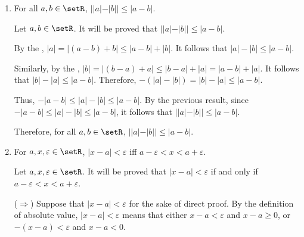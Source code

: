 \begin{enumerate}
\begin{enumerate}
\begin{subprove}
      (\(\Leftarrow\)) Suppose that \(-a \le b \le a\) for the sake of direct proof.
      Since \(-a \le b \le a\), it follows that \(a \ge -a\), which implies \(a \ge 0\).
      By the definition of absolute value, two cases are considered.
      
      \textbf{Case 1:} Suppose \(b \ge 0\).
      Then, by the definition of absolute value, \(|b| = b\).
      Since \(b \le a\), it follows that \(|b| = b \le a\).
      
      \textbf{Case 2:} Suppose \(b < 0\).
      Then, by the definition of absolute value, \(|b| = -b\).
      Since \(-a \le b\), it follows that \(-b \le a\).
      Therefore, \(|b| = -b \le a\).
      
      Therefore, if \(-a \le b \le a\), then \(|b| \le a\).
      
      Therefore, \(|b| \le a\) if and only if \(-a \le b \le a\).
    \end{subprove}
    \item For all \(a,b\in\setR\), \(||a|-|b||\le|a-b|\).
    \begin{subprove}
      Let \(a, b \in \setR\).
      It will be proved that \(||a| - |b|| \le |a - b|\).
      
      By the , \(|a| = |(a - b) + b| \le |a - b| + |b|\).
      It follows that \(|a| - |b| \le |a - b|\).
      
      Similarly, by the , \(|b| = |(b - a) + a| \le |b - a| + |a| = |a - b| + |a|\).
      It follows that \(|b| - |a| \le |a - b|\).
      Therefore, \(-(|a| - |b|) = |b| - |a| \le |a - b|\).
      
      Thus, \(-|a - b| \le |a| - |b| \le |a - b|\).
      By the previous result, since \(-|a - b| \le |a| - |b| \le |a - b|\), 
      it follows that \(||a| - |b|| \le |a - b|\).
      
      Therefore, for all \(a, b \in \setR\), \(||a| - |b|| \le |a - b|\).
    \end{subprove}
    \item For \(a,x,\varepsilon\in\setR\), \(|x-a|<\varepsilon\) iff \(a-\varepsilon<x<a+\varepsilon\).
    \begin{subprove}
      Let \(a, x, \varepsilon \in \setR\).
      It will be proved that \(|x-a| < \varepsilon\) if and only if \(a-\varepsilon < x < a+\varepsilon\).
      
      (\(\Rightarrow\)) Suppose that \(|x-a| < \varepsilon\) for the sake of direct proof.
      By the definition of absolute value, \(|x-a| < \varepsilon\) means that either \(x-a < \varepsilon\) and \(x-a \ge 0\), or \(-(x-a) < \varepsilon\) and \(x-a < 0\).
      

\end{subprove}
\end{enumerate}
\end{enumerate}
